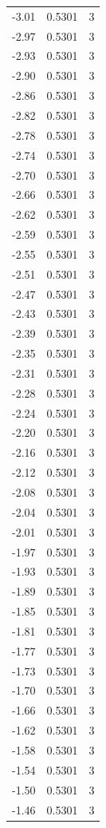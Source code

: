 \begin{longtable}{lrr}
  -3.01 & 0.5301 & 3 \\
  -2.97 & 0.5301 & 3 \\
  -2.93 & 0.5301 & 3 \\
  -2.90 & 0.5301 & 3 \\
  -2.86 & 0.5301 & 3 \\
  -2.82 & 0.5301 & 3 \\
  -2.78 & 0.5301 & 3 \\
  -2.74 & 0.5301 & 3 \\
  -2.70 & 0.5301 & 3 \\
  -2.66 & 0.5301 & 3 \\
  -2.62 & 0.5301 & 3 \\
  -2.59 & 0.5301 & 3 \\
  -2.55 & 0.5301 & 3 \\
  -2.51 & 0.5301 & 3 \\
  -2.47 & 0.5301 & 3 \\
  -2.43 & 0.5301 & 3 \\
  -2.39 & 0.5301 & 3 \\
  -2.35 & 0.5301 & 3 \\
  -2.31 & 0.5301 & 3 \\
  -2.28 & 0.5301 & 3 \\
  -2.24 & 0.5301 & 3 \\
  -2.20 & 0.5301 & 3 \\
  -2.16 & 0.5301 & 3 \\
  -2.12 & 0.5301 & 3 \\
  -2.08 & 0.5301 & 3 \\
  -2.04 & 0.5301 & 3 \\
  -2.01 & 0.5301 & 3 \\
  -1.97 & 0.5301 & 3 \\
  -1.93 & 0.5301 & 3 \\
  -1.89 & 0.5301 & 3 \\
  -1.85 & 0.5301 & 3 \\
  -1.81 & 0.5301 & 3 \\
  -1.77 & 0.5301 & 3 \\
  -1.73 & 0.5301 & 3 \\
  -1.70 & 0.5301 & 3 \\
  -1.66 & 0.5301 & 3 \\
  -1.62 & 0.5301 & 3 \\
  -1.58 & 0.5301 & 3 \\
  -1.54 & 0.5301 & 3 \\
  -1.50 & 0.5301 & 3 \\
  -1.46 & 0.5301 & 3 \\

\end{longtable}
